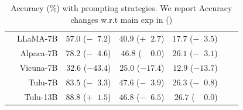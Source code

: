 \documentclass{beamer}
\begin{document}
\begin{frame}
\begin{columns}[t]
\begin{table}
{\begin{tabular}{lrrrrrr}
        & LLaMA-7B            & \cellcolor{'sred'} $57.0$ ($-\;\;7.2$)   & \cellcolor{'sgreen'} $40.9$ ($+\;\;2.7$)   & \cellcolor{'sred'}$17.7$ ($-\;\;3.5$)    \\
        & Alpaca-7B           & \cellcolor{'sred'} $78.2$ ($-\;\;4.6$)   &  $46.8$ ($\;\;\;\;0.0$)                        & \cellcolor{'sred'} $26.1$ ($-\;\;3.1$)    \\
        & Vicuna-7B           & \cellcolor{'sred'} $32.6$ ($-43.4$)  & \cellcolor{'sred'} $25.0$ ($-17.4$)    & \cellcolor{'sred'} $12.9$ ($-13.7$)       \\
        & Tulu-7B             & \cellcolor{'sred'} $83.5$ ($-\;\;3.3$)   & \cellcolor{'sred'} $47.6$ ($-\;\;3.9$)     & \cellcolor{'sred'} $26.3$ ($-\;\;0.8$)   \\ 
        &Tulu-13B             & \cellcolor{'sred'} $88.8$ ($+\;\;1.5$)   & \cellcolor{'sred'} $46.8$ ($-\;\;6.5$)     & $26.7$ ($\;\;\;\;0.0$)   \\
        \bottomrule
        \end{tabular}
        }
        \caption{
        Accuracy (\%) with prompting strategies.
        We report Accuracy changes w.r.t main exp in ()
        }
        \label{tab:prompting}
    \end{table}
\end{columns}
\end{frame}



\backmatter
{}


\end{document}
